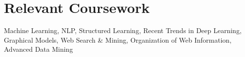 \section{\mysidestyle Relevant Coursework}
\vspace{0mm}
Machine Learning, NLP, Structured Learning, Recent Trends in Deep Learning, Graphical Models, Web Search \& Mining, Organization of Web Information, Advanced Data Mining